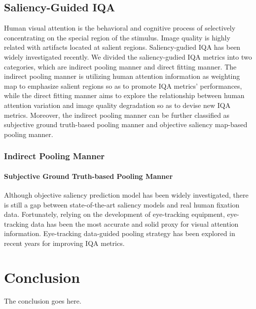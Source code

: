 \documentclass[journal]{IEEEtran}
\begin{document}
\subsection{Saliency-Guided IQA}
Human visual attention is the behavioral and cognitive process of selectively concentrating on the special region of the stimulus. Image quality is highly related with artifacts located at salient regions. Saliency-gudied IQA has been widely investigated recently. We divided the saliency-gudied IQA metrics into two categories, which are indirect pooling manner and direct fitting manner. The indirect pooling manner is utilizing human attention information as weighting map to emphasize salient regions so as to promote IQA metrics' performances, while the direct fitting manner aims to explore the relationship between human attention variation and image quality degradation so as to devise new IQA metrics.
Moreover, the indirect pooling manner can be further classified as subjective ground truth-based pooling manner and objective saliency map-based pooling manner.

\subsubsection{Indirect Pooling Manner}
\paragraph{Subjective Ground Truth-based Pooling Manner}

Although objective saliency prediction model has been widely investigated, there is still a gap between state-of-the-art saliency models and real human fixation data. Fortunately, relying on the development of eye-tracking equipment, eye-tracking data has been the most accurate and solid proxy for visual attention information. Eye-tracking data-guided pooling strategy has been explored in recent years for improving IQA metrics.





\section{Conclusion}
The conclusion goes here.










\end{document}

